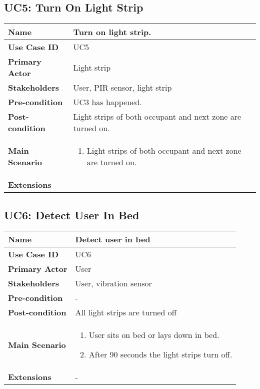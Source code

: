 \subsection{UC5: Turn On Light Strip}
    \begin{tabular}{|p{}||p{}|}
        \hline
        \textbf{Name} & Turn on light strip. \\
        \hline
        \textbf{Use Case ID} & UC5 \\
        \hline
        \textbf{Primary Actor} & Light strip \\
        \hline
        \textbf{Stakeholders} & User, PIR sensor, light strip \\
        \hline
        \textbf{Pre-condition} & UC3 has happened. \\
        \hline
        \textbf{Post-condition} & Light strips of both occupant and next zone are turned on. \\
        \hline
        \textbf{Main Scenario} &
            \begin{enumerate}
                \item Light strips of both occupant and next zone are turned on.
            \end{enumerate}
        \\
        \hline
        \textbf{Extensions} & - \\
        \hline
    \end{tabular}
    
    
    \subsection{UC6: Detect User In Bed}
    \begin{tabular}{|p{}||p{}|}
        \hline
        \textbf{Name} & Detect user in bed \\
        \hline
        \textbf{Use Case ID} & UC6 \\
        \hline
        \textbf{Primary Actor} & User \\
        \hline
        \textbf{Stakeholders} & User, vibration sensor \\
        \hline
        \textbf{Pre-condition} & -\\
        \hline
        \textbf{Post-condition} & All light strips are turned off \\
        \hline
        \textbf{Main Scenario} &
            \begin{enumerate}
                \item User sits on bed or lays down in bed.
                \item After 90 seconds the light strips turn off.
            \end{enumerate}
        \\
        \hline
        \textbf{Extensions} & - \\
        \hline
    \end{tabular}

